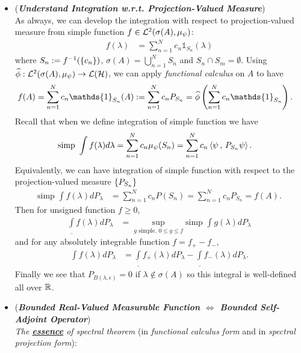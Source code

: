 \documentclass[11pt]{article}
\begin{document}
\begin{itemize}
\item \begin{remark} (\textbf{\emph{Understand Integration w.r.t. Projection-Valued Measure}})\\
As always, we can develop the integration with respect to projection-valued measure from simple function $f \in  {\mathcal L}^2(\sigma(A), \mu_{\psi})$:
\begin{align*}
f(\lambda) &= \sum_{n=1}^{N} c_n\mathds{1}_{S_n}(\lambda)
\end{align*} where $S_n := f^{-1}(\left\{c_n\right\})$, $\sigma(A) = \bigcup_{n=1}^{N}S_n$ and $S_n \cap S_m = \emptyset$. Using $\widehat{\phi}: {\mathcal L}^2(\sigma(A), \mu_{\psi}) \to {\mathcal L}({\mathcal H})$, we can apply \emph{functional calculus} on $A$ to have
\begin{align*}
f(A) &= \sum_{n=1}^{N} c_n \mathds{1}_{S_n}(A) := \sum_{n=1}^{N} c_n P_{S_n}= \widehat{\phi}\paren{ \sum_{n=1}^{N}c_n \mathds{1}_{S_n}}.
\end{align*}
Recall that when we define integration of simple function we have
\begin{align*}
\text{simp }\int f(\lambda) d\lambda &=  \sum_{n=1}^{N}c_n \mu_{\psi}(S_n) = \sum_{n=1}^{N} c_n \left\langle \psi\,,\, P_{S_n}\psi \right\rangle.
\end{align*} Equivalently, we can have integration of simple function with respect to the projection-valued measure $\left\{P_{S_n}\right\}$
\begin{align*}
\text{simp }\int f(\lambda) dP_{\lambda} &=  \sum_{n=1}^{N}c_n P(S_n) = \sum_{n=1}^{N}c_n P_{S_n} = f(A).
\end{align*}
Then for unsigned function $f \ge 0$,
\begin{align*}
\underline{\int} f(\lambda) dP_{\lambda} &= \sup_{g \text{ simple, } 0 \le g\le f}\text{simp }\int g(\lambda) dP_{\lambda}
\end{align*} and for any absolutely integrable function $f = f_{+} - f_{-}$, 
\begin{align*}
\int f(\lambda) dP_{\lambda}  &= \underline{\int} f_{+}(\lambda) dP_{\lambda}  - \underline{\int} f_{-}(\lambda) dP_{\lambda}.
\end{align*}Finally we see that $P_{B(\lambda, \epsilon)} = 0$ if $\lambda \not\in \sigma(A)$ so this integral is well-defined all over ${\mathbb R}$.
\end{remark}


\item \begin{remark} (\emph{\textbf{Bounded Real-Valued Measurable Function $\Leftrightarrow$ Bounded Self-Adjoint Operator}}) \citep{halmos2017introduction}\\
\emph{The \underline{\textbf{essence}} of spectral theorem} (in \emph{functional calculus form} and in \emph{spectral projection form}):


\end{remark}
\end{itemize}
\end{document}
